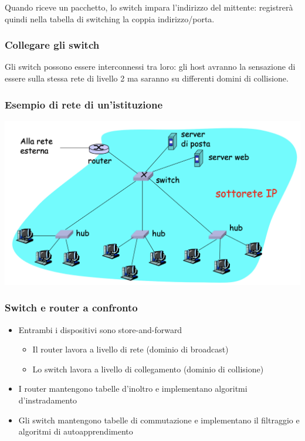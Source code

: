 \documentclass{report}
\begin{document}
Quando riceve un pacchetto, lo switch impara l'indirizzo del mittente:
registrerà quindi nella tabella di switching la coppia indirizzo/porta.

\hypertarget{header-n224}{%
\subsubsection{Collegare gli switch}\label{header-n224}}

Gli switch possono essere interconnessi tra loro: gli host avranno la
sensazione di essere sulla stessa rete di livello 2 ma saranno su
differenti domini di collisione.

\hypertarget{header-n226}{%
\subsubsection{Esempio di rete di un'istituzione}\label{header-n226}}

\begin{center}
		\includegraphics[width=0.7\linewidth]{istituzione}
	\end{center}

\hypertarget{header-n228}{%
\subsubsection{Switch e router a confronto}\label{header-n228}}

\begin{itemize}
\item
  Entrambi i dispositivi sono store-and-forward

  \begin{itemize}
  \item
    Il router lavora a livello di rete (dominio di broadcast)
  \item
    Lo switch lavora a livello di collegamento (dominio di collisione)
  \end{itemize}
\item
  I router mantengono tabelle d'inoltro e implementano algoritmi
  d'instradamento
\item
  Gli switch mantengono tabelle di commutazione e implementano il
  filtraggio e algoritmi di autoapprendimento
\end{itemize}
\end{document}
